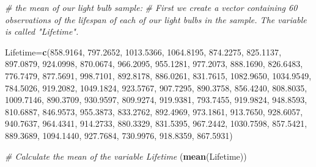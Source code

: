 \documentclass[
]{book}
\newenvironment{Shaded}{\begin{snugshade}}{\end{snugshade}}
\newcommand{\CommentTok}[1]{\textcolor[rgb]{0.56,0.35,0.01}{\textit{#1}}}
\newcommand{\FloatTok}[1]{\textcolor[rgb]{0.00,0.00,0.81}{#1}}
\newcommand{\FunctionTok}[1]{\textcolor[rgb]{0.13,0.29,0.53}{\textbf{#1}}}
\newcommand{\NormalTok}[1]{#1}
\newcommand{\OtherTok}[1]{\textcolor[rgb]{0.56,0.35,0.01}{#1}}
\begin{document}
\begin{Shaded}
\begin{Highlighting}[]
\CommentTok{\# the mean of our light bulb sample:}
\CommentTok{\# First we create a vector containing 60 observations of the lifespan of each of our light bulbs in the sample. The variable is called "Lifetime".}

\NormalTok{Lifetime}\OtherTok{=}\FunctionTok{c}\NormalTok{(}\FloatTok{858.9164}\NormalTok{,  }\FloatTok{797.2652}\NormalTok{, }\FloatTok{1013.5366}\NormalTok{, }\FloatTok{1064.8195}\NormalTok{,  }\FloatTok{874.2275}\NormalTok{,  }\FloatTok{825.1137}\NormalTok{,}
           \FloatTok{897.0879}\NormalTok{,  }\FloatTok{924.0998}\NormalTok{,  }\FloatTok{870.0674}\NormalTok{,  }\FloatTok{966.2095}\NormalTok{,  }\FloatTok{955.1281}\NormalTok{,  }\FloatTok{977.2073}\NormalTok{,}
           \FloatTok{888.1690}\NormalTok{,  }\FloatTok{826.6483}\NormalTok{,  }\FloatTok{776.7479}\NormalTok{,  }\FloatTok{877.5691}\NormalTok{,  }\FloatTok{998.7101}\NormalTok{,  }\FloatTok{892.8178}\NormalTok{,}
           \FloatTok{886.0261}\NormalTok{,  }\FloatTok{831.7615}\NormalTok{, }\FloatTok{1082.9650}\NormalTok{, }\FloatTok{1034.9549}\NormalTok{,  }\FloatTok{784.5026}\NormalTok{,  }\FloatTok{919.2082}\NormalTok{,}
           \FloatTok{1049.1824}\NormalTok{,  }\FloatTok{923.5767}\NormalTok{,  }\FloatTok{907.7295}\NormalTok{,  }\FloatTok{890.3758}\NormalTok{,  }\FloatTok{856.4240}\NormalTok{,  }\FloatTok{808.8035}\NormalTok{,}
           \FloatTok{1009.7146}\NormalTok{,  }\FloatTok{890.3709}\NormalTok{,  }\FloatTok{930.9597}\NormalTok{,  }\FloatTok{809.9274}\NormalTok{,  }\FloatTok{919.9381}\NormalTok{,  }\FloatTok{793.7455}\NormalTok{,}
           \FloatTok{919.9824}\NormalTok{,  }\FloatTok{948.8593}\NormalTok{,  }\FloatTok{810.6887}\NormalTok{,  }\FloatTok{846.9573}\NormalTok{,  }\FloatTok{955.3873}\NormalTok{,  }\FloatTok{833.2762}\NormalTok{,}
           \FloatTok{892.4969}\NormalTok{,  }\FloatTok{973.1861}\NormalTok{,  }\FloatTok{913.7650}\NormalTok{,  }\FloatTok{928.6057}\NormalTok{,  }\FloatTok{940.7637}\NormalTok{,  }\FloatTok{964.4341}\NormalTok{,}
           \FloatTok{914.2733}\NormalTok{,  }\FloatTok{880.3329}\NormalTok{,  }\FloatTok{831.5395}\NormalTok{,  }\FloatTok{967.2442}\NormalTok{, }\FloatTok{1030.7598}\NormalTok{,  }\FloatTok{857.5421}\NormalTok{,}
           \FloatTok{889.3689}\NormalTok{, }\FloatTok{1094.1440}\NormalTok{,  }\FloatTok{927.7684}\NormalTok{,  }\FloatTok{730.9976}\NormalTok{,  }\FloatTok{918.8359}\NormalTok{,  }\FloatTok{867.5931}\NormalTok{)}

\CommentTok{\# Calculate the mean of the variable Lifetime}
\NormalTok{(}\FunctionTok{mean}\NormalTok{(Lifetime))}
\end{Highlighting}
\end{Shaded}
\end{document}
